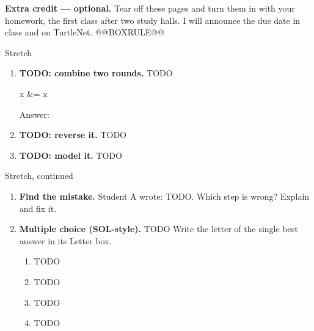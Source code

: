 \documentclass[12pt]{article}
\begin{document}

\vspace{0.10in}

\boxguard[8]
\begin{remindbox}
\small
\textbf{Extra credit --- optional.} Tear off these pages and turn them in with your homework,
the first class after two study halls. I will announce the due date in class and on TurtleNet.
@@BOXRULE@@
\end{remindbox}

\vspace{0.08in}

\begin{notesbox}{Stretch}
\small
\begin{enumerate}[leftmargin=1.9em, itemsep=10pt]
  \item \textbf{TODO: combine two rounds.} TODO
    \begin{work}
      x &= x
    \end{work}
    Answer: \inblank{\blank{5.0cm}}{\gradedblank[id=q1, type=short, points=2, answer={TODO}, check=expression]{5.0cm-2pt}{12.5pt}}

  \item \textbf{TODO: reverse it.} TODO

  \item \textbf{TODO: model it.} TODO
\end{enumerate}
\end{notesbox}

\newpage
\begin{notesbox}{Stretch, continued}
\small
\begin{enumerate}[leftmargin=1.9em, itemsep=10pt, start=4]
  \boxguard[24]
  \item \textbf{Find the mistake.} Student A wrote: TODO. Which step is wrong? Explain and fix it.
    \rubricbox{\gradedblank[id=q4, type=rubric, points=3, display={TODO: the model answer}]{\linewidth}{2in}}

  \item \textbf{Multiple choice (SOL-style).} TODO Write the letter of the single best answer in its Letter box.
    \begin{enumerate}[label=(\Alph*), leftmargin=2.0em, itemsep=1pt]
      \item TODO
      \item TODO
      \item TODO
      \item TODO
    \end{enumerate}
\end{enumerate}
\end{notesbox}
\end{document}
